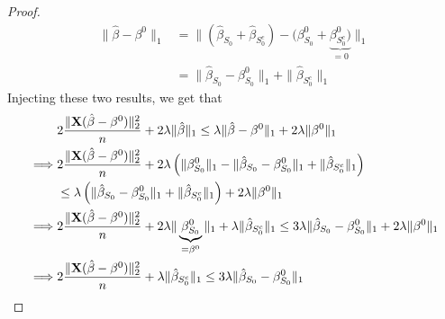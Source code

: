 \begin{proof}
    \begin{align*}
        \|\hat{\beta}-\beta^{0} \|_{1}
         & =  \| (\hat{\beta}_{S_{0}} + \hat{\beta}_{S_{0}^{c}}) - (\beta_{S_{0}}^{0} + \underbrace{\beta_{S_{0}^{c}}^0)}_{=0} \|_{1} \\
         & =  \| \hat{\beta}_{S_{0}}-\beta_{S_{0}}^{0} \|_{1} + \|\hat{\beta}_{S_{0}^{c}} \|_{1}
    \end{align*}
    Injecting these two results, we get that
    \begin{align*}
                 & 2 \frac{\| \mathbf{X} (\hat{\beta}-\beta^{0})\|_{2}^{2}}{n} + 2 \lambda\|\hat{\beta}\|_{1} \leq \lambda \|\hat{\beta}-\beta^{0} \|_{1}+2 \lambda \|\beta^{0} \|_{1}                                                                                                  \\
        \implies & 2 \frac{\| \mathbf{X} (\hat{\beta}-\beta^{0})\|_{2}^{2}}{n} + 2 \lambda \left( \|\beta_{S_{0}}^{0} \|_{1} - \|\hat{\beta}_{S_{0}}-\beta_{S_{0}}^{0} \|_{1}+ \|\hat{\beta}_{S_{0}^{c}} \|_{1} \right)                                                                 \\
                 & \leq \lambda \left( \| \hat{\beta}_{S_{0}}-\beta_{S_{0}}^{0} \|_{1} + \|\hat{\beta}_{S_{0}^{c}} \|_{1} \right) + 2 \lambda \|\beta^{0} \|_{1}                                                                                                                \\
        \implies & 2 \frac{\| \mathbf{X} (\hat{\beta}-\beta^{0})\|_{2}^{2}}{n} + 2 \lambda \|\underbrace{\beta_{S_{0}}^{0}}_{= \beta^0} \|_{1} + \lambda \|\hat{\beta}_{S_{0}^{c}} \|_{1} \leq 3 \lambda \| \hat{\beta}_{S_{0}}-\beta_{S_{0}}^{0} \|_{1} + 2 \lambda \|\beta^{0} \|_{1} \\
        \implies & 2\frac{ \|\mathbf{X} (\hat{\beta}-\beta^{0} ) \|_{2}^{2}}{n} + \lambda \|\hat{\beta}_{S_{0}^{c}} \|_{1} \leq 3 \lambda \|\hat{\beta}_{S_{0}}-\beta_{S_{0}}^{0} \|_{1}
    \end{align*}
\end{proof}


